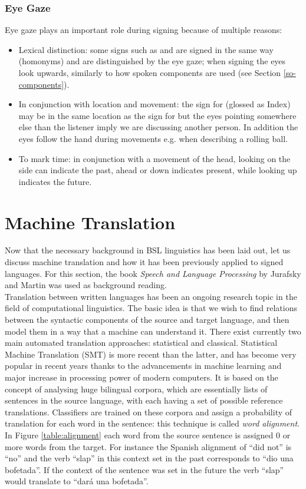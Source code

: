 \documentclass[12pt]{ociamthesis}  %
\begin{document}
\subsubsection{Eye Gaze}
\label{eye-gaze}
Eye gaze plays an important role during signing because of multiple reasons:
\begin{itemize}
	\item Lexical distinction: some signs such as  and  are signed in the same way (homonyms) and are distinguished by the eye gaze; when signing  the eyes look upwards, similarly to how spoken components are used (see Section \ref{so-components}).
	\item In conjunction with location and movement: the sign for  (glossed as Index) may be in the same location as the sign for  but the eyes pointing somewhere else than the listener imply we are discussing another person. In addition the eyes follow the hand during movements e.g. when describing a rolling ball. 
	\item To mark time: in conjunction with a movement of the head, looking on the side can indicate the past, ahead or down indicates present, while looking up indicates the future.
\end{itemize}

\section{Machine Translation}
\label{machine translation}
Now that the necessary background in BSL linguistics has been laid out, let us discuss machine translation and how it has been previously applied to signed languages. For this section, the book \textit{Speech and Language Processing} by Jurafsky and Martin was used as background reading.\\

Translation between written languages has been an ongoing research topic in the field of computational linguistics. The basic idea is that we wish to find relations between the syntactic components of the source and target language, and then model them in a way that a machine can understand it. There exist currently two main automated translation approaches: statistical and classical. Statistical Machine Translation (SMT) is more recent than the latter, and has become very popular in recent years thanks to the advancements in machine learning and major increase in processing power of modern computers. It is based on the concept of analysing huge bilingual corpora, which are essentially lists of sentences in the source language, with each having a set of possible reference translations. Classifiers are trained on these corpora and assign a probability of translation for each word in the sentence: this technique is called \textit{word alignment}. In Figure \ref{table:alignment}  each word from the source sentence is assigned 0 or more words from the target. For instance the Spanish alignment of ``did not'' is ``no'' and the verb ``slap'' in this context set in the past corresponds to ``dio una bofetada''. If the context of the sentence was set in the future the verb ``slap'' would translate to ``dar\'a una bofetada''.
\end{document}
